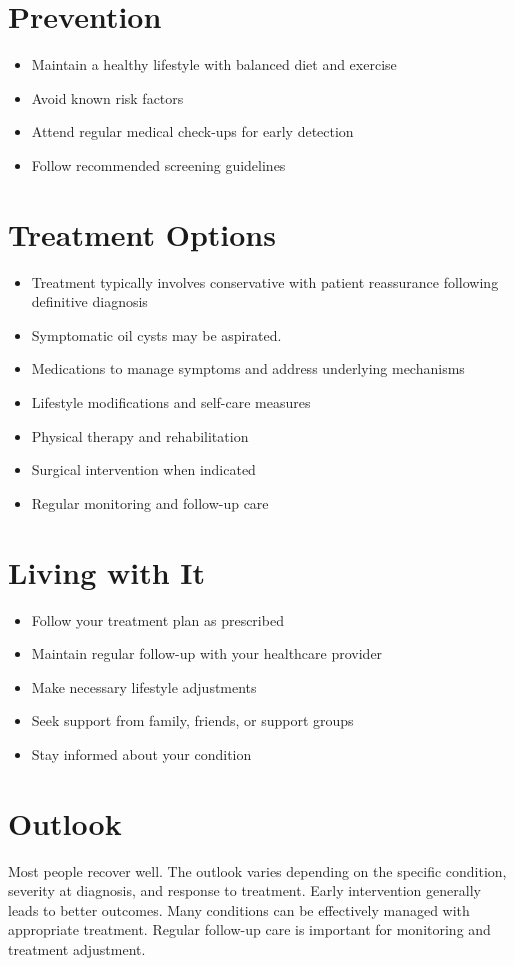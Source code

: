 \section{Prevention}
\begin{itemize}[noitemsep]
  \item Maintain a healthy lifestyle with balanced diet and exercise
  \item Avoid known risk factors
  \item Attend regular medical check-ups for early detection
  \item Follow recommended screening guidelines
\end{itemize}
\section{Treatment Options}
\begin{itemize}[noitemsep]
  \item Treatment typically involves conservative with patient reassurance following definitive diagnosis
  \item Symptomatic oil cysts may be aspirated.
  \item Medications to manage symptoms and address underlying mechanisms
  \item Lifestyle modifications and self-care measures
  \item Physical therapy and rehabilitation
  \item Surgical intervention when indicated
  \item Regular monitoring and follow-up care
\end{itemize}
\section{Living with It}
\begin{itemize}[noitemsep]
  \item Follow your treatment plan as prescribed
  \item Maintain regular follow-up with your healthcare provider
  \item Make necessary lifestyle adjustments
  \item Seek support from family, friends, or support groups
  \item Stay informed about your condition
\end{itemize}
\section{Outlook}
Most people recover well. The outlook varies depending on the specific condition, severity at diagnosis, and response to treatment. Early intervention generally leads to better outcomes. Many conditions can be effectively managed with appropriate treatment. Regular follow-up care is important for monitoring and treatment adjustment.
